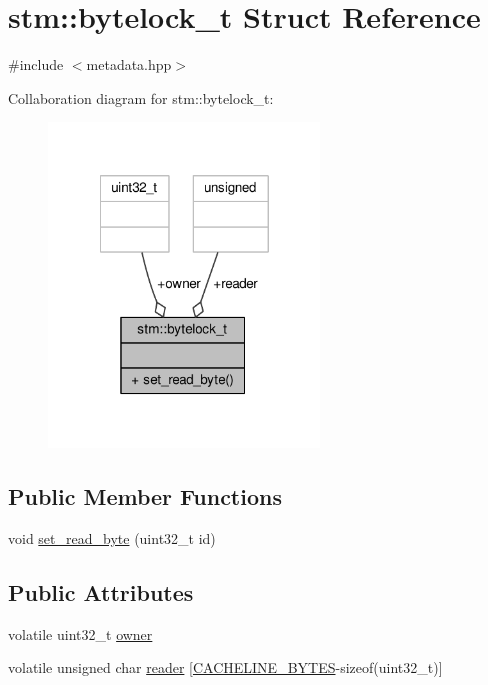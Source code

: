 \hypertarget{structstm_1_1bytelock__t}{\section{stm\-:\-:bytelock\-\_\-t Struct Reference}
\label{structstm_1_1bytelock__t}
}


{\ttfamily \#include $<$metadata.\-hpp$>$}



Collaboration diagram for stm\-:\-:bytelock\-\_\-t\-:
\nopagebreak
\begin{figure}[H]
\begin{center}
\leavevmode
\includegraphics[width=204pt]{structstm_1_1bytelock__t__coll__graph}
\end{center}
\end{figure}
\subsection*{Public Member Functions}
\begin{DoxyCompactItemize}
\item 
void \hyperlink{structstm_1_1bytelock__t_a513888b4e0df93693d25b4c19d1cfdfc}{set\-\_\-read\-\_\-byte} (uint32\-\_\-t id)
\end{DoxyCompactItemize}
\subsection*{Public Attributes}
\begin{DoxyCompactItemize}
\item 
volatile uint32\-\_\-t \hyperlink{structstm_1_1bytelock__t_aa8374c1b43bca7bde750523925e2ccc5}{owner}
\item 
volatile unsigned char \hyperlink{structstm_1_1bytelock__t_a00f1e7e9b66381db5b9a0ffb39912342}{reader} \mbox{[}\hyperlink{platform_8hpp_a4538b5ec4a295a2b8a52560e61575041}{C\-A\-C\-H\-E\-L\-I\-N\-E\-\_\-\-B\-Y\-T\-E\-S}-\/sizeof(uint32\-\_\-t)\mbox{]}
\end{DoxyCompactItemize}



